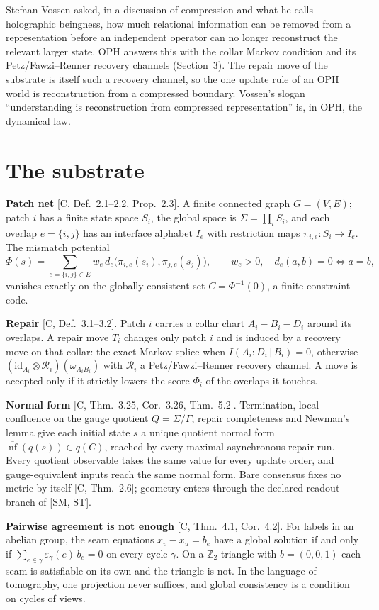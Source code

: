 \documentclass[11pt]{article}
\newcommand{\id}{\mathrm{id}}
\newcommand{\nf}{\operatorname{nf}}
\newcommand{\cit}[1]{[#1]}
\begin{document}
Stefaan Vossen asked, in a discussion of compression and what he calls holographic
beingness, how much relational information can be removed from a representation
before an independent operator can no longer reconstruct the relevant larger state.
OPH answers this with the collar Markov condition and its Petz/Fawzi--Renner recovery
channels (Section~3). The repair move of the substrate is itself such a recovery
channel, so the one update rule of an OPH world is reconstruction from a compressed
boundary. Vossen's slogan ``understanding is reconstruction from compressed
representation'' is, in OPH, the dynamical law.

\section{The substrate}

\textbf{Patch net} \cit{C, Def.~2.1--2.2, Prop.~2.3}. A finite connected graph
$G=(V,E)$; patch $i$ has a finite state space $S_i$, the global space is
$\Sigma=\prod_i S_i$, and each overlap $e=\{i,j\}$ has an interface alphabet $I_e$
with restriction maps $\pi_{i,e}:S_i\to I_e$. The mismatch potential
\[
\Phi(s)=\sum_{e=\{i,j\}\in E} w_e\,d_e\bigl(\pi_{i,e}(s_i),\pi_{j,e}(s_j)\bigr),
\qquad w_e>0,\quad d_e(a,b)=0\iff a=b,
\]
vanishes exactly on the globally consistent set $C=\Phi^{-1}(0)$, a finite constraint code.

\textbf{Repair} \cit{C, Def.~3.1--3.2}. Patch $i$ carries a collar chart
$A_i\!-\!B_i\!-\!D_i$ around its overlaps. A repair move $T_i$ changes only patch $i$
and is induced by a recovery move on that collar: the exact Markov splice when
$I(A_i{:}D_i\,|\,B_i)=0$, otherwise
$(\id_{A_i}\otimes\mathcal R_i)(\omega_{A_iB_i})$ with $\mathcal R_i$ a
Petz/Fawzi--Renner recovery channel. A move is accepted only if it strictly lowers
the score $\Phi_i$ of the overlaps it touches.

\textbf{Normal form} \cit{C, Thm.~3.25, Cor.~3.26, Thm.~5.2}. Termination, local
confluence on the gauge quotient $Q=\Sigma/\Gamma$, repair completeness and Newman's
lemma give each
initial state $s$ a unique quotient normal form $\overline{\nf}(q(s))\in q(C)$,
reached by every maximal asynchronous repair run. Every quotient observable takes the
same value for every update order, and gauge-equivalent inputs reach the same normal
form. Bare consensus fixes no metric by itself \cit{C, Thm.~2.6}; geometry enters
through the declared readout branch of \cit{SM, ST}.

\textbf{Pairwise agreement is not enough} \cit{C, Thm.~4.1, Cor.~4.2}. For labels in
an abelian group, the seam equations $x_v-x_u=b_e$ have a global solution if and only
if $\sum_{e\in\gamma}\varepsilon_\gamma(e)\,b_e=0$ on every cycle $\gamma$. On a
$\mathbb Z_2$ triangle with $b=(0,0,1)$ each seam is satisfiable on its own and the
triangle is not. In the language of tomography, one projection never suffices, and
global consistency is a condition on cycles of views.
\end{document}
